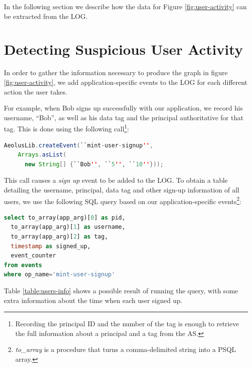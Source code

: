 In the following section we describe how the data for Figure \ref{fig:user-activity} can be extracted from the LOG.

\section{Detecting Suspicious User Activity}
\label{audit:mint-example}
In order to gather the information necessary to produce the graph in figure \ref{fig:user-activity}, we add application-specific events to the LOG for each different action the user takes.

For example, when Bob signs up successfully with our application, we record his username, ``Bob'', as well as his data tag and the principal authoritative for that tag. This is done using the following call\footnote{Recording the principal ID and the number of the tag is enough to retrieve the full information about a principal and a tag from the AS.}:

\begin{lstlisting}[language=Java, label=code:create-event]
  AeolusLib.createEvent(``mint-user-signup'', 
    Arrays.asList(
      new String[] {``Bob'', ``5'', ``10''}));
\end{lstlisting}

\noindent
This call causes a \emph{sign up} event to be added to the LOG. To obtain a table detailing the username, principal, data tag and other sign-up information of all users, we use the following SQL query based on our application-specific events\footnote{\emph{to\_array} is a procedure that turns a comma-delimited string into a PSQL array.}:

\begin{lstlisting}[language=SQL, deletendkeywords={TIMESTAMP}, label=code:mint-signup]
select to_array(app_arg)[0] as pid, 
  to_array(app_arg)[1] as username, 
  to_array(app_arg)[2] as tag, 
  timestamp as signed_up, 
  event_counter 
from events 
where op_name='mint-user-signup'
\end{lstlisting}

\noindent
Table \ref{table:users-info} shows a possible result of running the query, with some extra information about the time when each user signed up.

